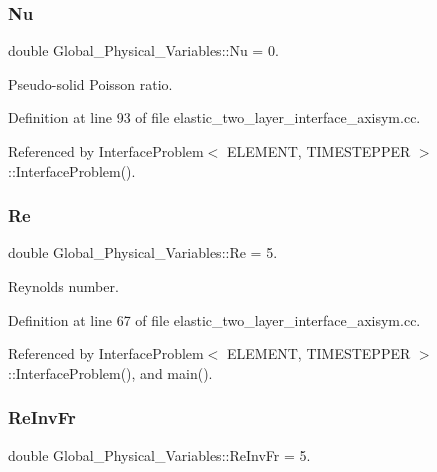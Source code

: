 \subsubsection{\texorpdfstring{Nu}{Nu}}
{\footnotesize\ttfamily double Global\+\_\+\+Physical\+\_\+\+Variables\+::\+Nu = 0.}



Pseudo-\/solid Poisson ratio. 



Definition at line 93 of file elastic\+\_\+two\+\_\+layer\+\_\+interface\+\_\+axisym.\+cc.



Referenced by Interface\+Problem$<$ E\+L\+E\+M\+E\+N\+T, T\+I\+M\+E\+S\+T\+E\+P\+P\+E\+R $>$\+::\+Interface\+Problem().

\mbox{\label{namespaceGlobal__Physical__Variables_ab814e627d2eb5bc50318879d19ab16b9}} 
\subsubsection{\texorpdfstring{Re}{Re}}
{\footnotesize\ttfamily double Global\+\_\+\+Physical\+\_\+\+Variables\+::\+Re = 5.}



Reynolds number. 



Definition at line 67 of file elastic\+\_\+two\+\_\+layer\+\_\+interface\+\_\+axisym.\+cc.



Referenced by Interface\+Problem$<$ E\+L\+E\+M\+E\+N\+T, T\+I\+M\+E\+S\+T\+E\+P\+P\+E\+R $>$\+::\+Interface\+Problem(), and main().

\mbox{\label{namespaceGlobal__Physical__Variables_aa6286f02b476912dd7550eced538331a}} 
\subsubsection{\texorpdfstring{Re\+Inv\+Fr}{ReInvFr}}
{\footnotesize\ttfamily double Global\+\_\+\+Physical\+\_\+\+Variables\+::\+Re\+Inv\+Fr = 5.}



